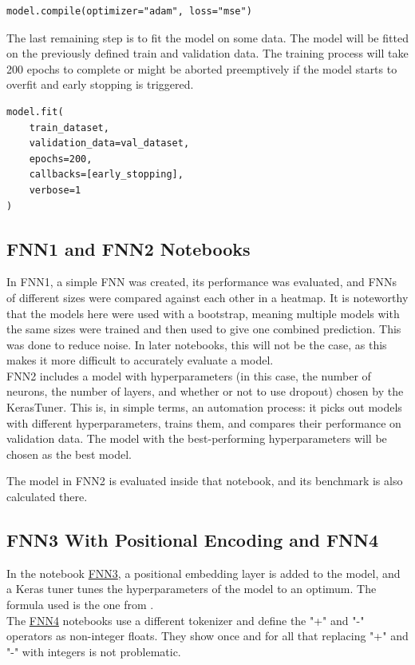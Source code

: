 \documentclass{article}
\begin{document}
\begin{Verbatim}
model.compile(optimizer="adam", loss="mse")
\end{Verbatim}

The last remaining step is to fit the model on some data. The model will be fitted on the previously defined train and validation data. The training process will take 200 epochs to complete or might be aborted preemptively if the model starts to overfit and early stopping is triggered.

\begin{Verbatim}
model.fit(
    train_dataset,
    validation_data=val_dataset,
    epochs=200,
    callbacks=[early_stopping],
    verbose=1
)
\end{Verbatim}

\subsection{FNN1 and FNN2 Notebooks}
In FNN1, a simple FNN was created, its performance was evaluated, and FNNs of different sizes were compared against each other in a heatmap. It is noteworthy that the models here were used with a bootstrap, meaning multiple models with the same sizes were trained and then used to give one combined prediction. This was done to reduce noise. In later notebooks, this will not be the case, as this makes it more difficult to accurately evaluate a model.
\\[2em]
FNN2 includes a model with hyperparameters (in this case, the number of neurons, the number of layers, and whether or not to use dropout) chosen by the KerasTuner. This is, in simple terms, an automation process: it picks out models with different hyperparameters, trains them, and compares their performance on validation data. The model with the best-performing hyperparameters will be chosen as the best model.

The model in FNN2 is evaluated inside that notebook, and its benchmark is also calculated there.


\subsection{FNN3 With Positional Encoding and FNN4}

In the notebook \href{https://github.com/AntonStantan/matura/blob/main/FNN/FNN3.ipynb}{FNN3}, a positional embedding layer is added to the model, and a Keras tuner tunes the hyperparameters of the model to an optimum. The formula used is the one from \cite{vaswani2023attentionneed}.
\\
The \href{https://github.com/AntonStantan/matura/blob/main/FNN/FNN4.ipynb}{FNN4} notebooks use a different tokenizer and define the "+" and "-" operators as non-integer floats. They show once and for all that replacing "+" and "-" with integers is not problematic.
\end{document}
